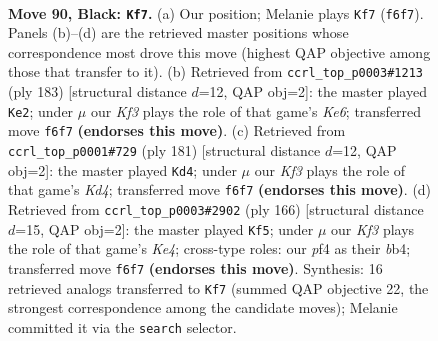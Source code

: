 \documentclass[11pt]{article}
\begin{document}
\clearpage

\begin{figure}[p]\centering
\begin{subfigure}{0.46\textwidth}\centering
\resizebox{\linewidth}{!}{%
\newchessgame
\chessboard[
  setfen={7R/3b4/5k2/5p2/5P2/3r4/7K/8 b - - 4 90},
  showmover=false,
  pgfstyle=straightmove, color=movearrow, markmove={f6-f7}
]}
\caption{}
\end{subfigure}\hfill
\begin{subfigure}{0.46\textwidth}\centering
\resizebox{\linewidth}{!}{%
\newchessgame
\chessboard[
  setfen={8/8/8/8/2K4R/p3k3/Pb6/8 b - - 55 92},
  showmover=false,
  pgfstyle=straightmove, color=movearrow, markmove={e3-e2}
]}
\caption{}
\end{subfigure}
\\[4pt]
\begin{subfigure}{0.46\textwidth}\centering
\resizebox{\linewidth}{!}{%
\newchessgame
\chessboard[
  setfen={8/8/R4K2/3k3p/6bP/8/8/8 b - - 38 91},
  showmover=false,
  pgfstyle=straightmove, color=movearrow, markmove={d5-d4}
]}
\caption{}
\end{subfigure}\hfill
\begin{subfigure}{0.46\textwidth}\centering
\resizebox{\linewidth}{!}{%
\newchessgame
\chessboard[
  setfen={8/5B2/3r3k/8/1b2K3/1P4R1/8/8 w - - 75 84},
  showmover=false,
  pgfstyle=straightmove, color=movearrow, markmove={e4-f5}
]}
\caption{}
\end{subfigure}
\caption{\textbf{Move 90, Black: \texttt{Kf7}.} (a) Our position; Melanie plays \texttt{Kf7} (\texttt{f6f7}). Panels (b)--(d) are the retrieved master positions whose correspondence most drove this move (highest QAP objective among those that transfer to it). (b) Retrieved from \texttt{ccrl\_top\_p0003\#1213} (ply 183) [structural distance $d$=12, QAP obj=2]: the master played \texttt{Ke2}; under $\mu$ our \emph{Kf3} plays the role of that game's \emph{Ke6}; transferred move \texttt{f6f7} \textbf{(endorses this move)}. (c) Retrieved from \texttt{ccrl\_top\_p0001\#729} (ply 181) [structural distance $d$=12, QAP obj=2]: the master played \texttt{Kd4}; under $\mu$ our \emph{Kf3} plays the role of that game's \emph{Kd4}; transferred move \texttt{f6f7} \textbf{(endorses this move)}. (d) Retrieved from \texttt{ccrl\_top\_p0003\#2902} (ply 166) [structural distance $d$=15, QAP obj=2]: the master played \texttt{Kf5}; under $\mu$ our \emph{Kf3} plays the role of that game's \emph{Ke4}; cross-type roles: our \emph{p}f4 as their \emph{b}b4; transferred move \texttt{f6f7} \textbf{(endorses this move)}. Synthesis: 16 retrieved analogs transferred to \texttt{Kf7} (summed QAP objective 22, the strongest correspondence among the candidate moves); Melanie committed it via the \texttt{search} selector.}
\label{fig:thought-m179}
\end{figure}
\end{document}
